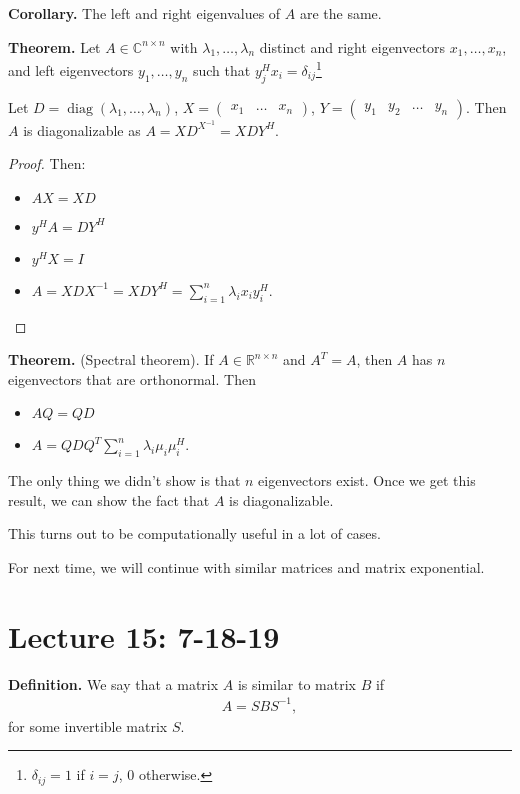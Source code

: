 \documentclass{article}
\newcommand{\mat}[1]{\begin{pmatrix}#1\end{pmatrix}}
\newcommand{\RR}{\mathbb{R}}
\newcommand{\CC}{\mathbb{C}}
\DeclareMathOperator{\diag}{diag}
\begin{document}
{\bf Corollary.} The left and right eigenvalues of $A$ are the same.

{\bf Theorem.} Let $A \in \CC^{n \times n}$ with $\lambda_1, \dots, \lambda_n$ distinct and right eigenvectors $x_1, \dots, x_n$, and left eigenvectors $y_1, \dots, y_n$ such that $y_j^H x_i = \delta_{ij}$\footnote{$\delta_{ij} = 1$ if $i = j$, $0$ otherwise.}

Let $D = \diag (\lambda_1, \dots, \lambda_n)$, $X = \mat{x_1 & \dots & x_n}$, $Y = \mat{y_1 & y_2 & \dots & y_n}$.  Then $A$ is diagonalizable as $A = X D^ X^{-1} = X D Y^H$.


\begin{proof} 
Then:

\begin{itemize}
  \item $AX = XD$
  \item $y^H A = D Y^H$
  \item $y^H X = I$
  \item $A = X D X^{-1} = X D Y^H = \sum_{i=1}^{n} \lambda_i x_i y_i^H$.
\end{itemize}
\end{proof}

{\bf Theorem.} (Spectral theorem).  If $A \in \RR^{n \times n}$ and $A^T = A$, then $A$ has $n$ eigenvectors that are orthonormal.  Then

\begin{itemize}
  \item $AQ = QD$
  \item $A = QDQ^T \sum_{i=1}^{n} \lambda_i \mu_i \mu_i^H$.
\end{itemize}

The only thing we didn't show is that $n$ eigenvectors exist.  Once we get this result, we can show the fact that $A$ is diagonalizable.

This turns out to be computationally useful in a lot of cases.

For next time, we will continue with similar matrices and matrix exponential.

\section{Lecture 15: 7-18-19}

{\bf Definition.} We say that a matrix $A$ is similar to matrix $B$ if
\begin{align*}
  A = S B S^{-1},
\end{align*}
for some invertible matrix $S$.
\end{document}
